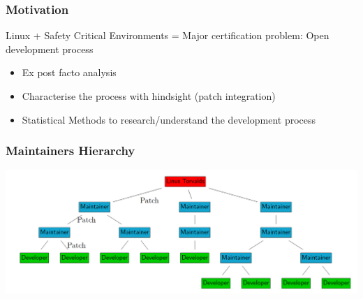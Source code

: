 \documentclass[9pt]{beamer}
\begin{document}
	\begin{frame}
	\frametitle{Motivation}
		\begin{block}{Linux + Safety Critical Environments}
			= Major certification problem: Open development process
		\end{block}
			\begin{itemize}
				\item Ex post facto analysis
				\item Characterise the process with hindsight (patch integration)
				\item Statistical Methods to research/understand the development process
			\end{itemize}


	\end{frame}


	\begin{frame}
	\frametitle{Maintainers Hierarchy}
     		\includegraphics[width=1.0\textwidth]{pics/maintainers_hierarchy.png}
	\end{frame}

\end{document}
